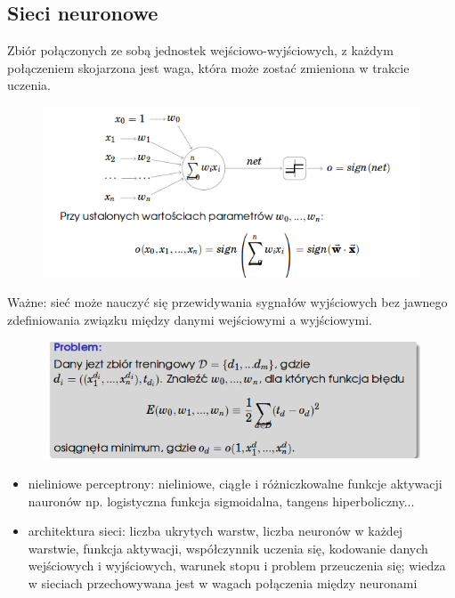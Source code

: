 \documentclass[10pt,a4paper]{article}
\begin{document}
\subsection{Sieci neuronowe}
Zbiór połączonych ze sobą jednostek wejściowo-wyjściowych, z każdym połączeniem skojarzona jest waga, która może zostać zmieniona w trakcie uczenia.
\begin{figure}[H]
  \centering
    \includegraphics[scale=0.50]{images/siec.png}
\end{figure}
Ważne: sieć może nauczyć się przewidywania sygnałów wyjściowych bez jawnego zdefiniowania związku między danymi wejściowymi a wyjściowymi.
\begin{figure}[H]
  \centering
    \includegraphics[scale=0.50]{images/perc.png}
\end{figure}
\begin{itemize}
  \item nieliniowe perceptrony: nieliniowe, ciągłe i różniczkowalne funkcje aktywacji nauronów  np. logistyczna funkcja sigmoidalna, tangens hiperboliczny...
  \item architektura sieci: liczba ukrytych warstw, liczba neuronów w każdej warstwie, funkcja aktywacji, współczynnik uczenia się, kodowanie danych wejściowych i wyjściowych, warunek stopu i problem przeuczenia się; wiedza w sieciach przechowywana jest w wagach połączenia między neuronami
\end{itemize}
\end{document}
